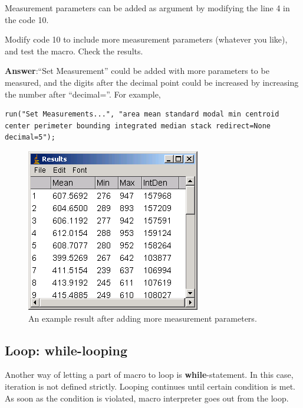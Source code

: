Measurement parameters can be added as argument by modifying the line 4 in the code 10.

\begin{indentexercise}{1}
Modify code 10 to include more measurement parameters (whatever you like), and test the macro. Check the results. 

\item \textbf{Answer}:``Set Measurement'' could be added with more parameters to be measured, and the digits after the decimal point could be increased by increasing the number after ``decimal=''. For example, 
\begin{lstlisting}[numbers=none]
run("Set Measurements...", "area mean standard modal min centroid center perimeter bounding integrated median stack redirect=None decimal=5");
\end{lstlisting}

\end{indentexercise}

\begin{figure}[htbp]
\begin{center}
\includegraphics[scale=0.5]{fig/fig2322_moreResultsTable.png}
\caption{An example result after adding more measurement parameters.}
\label{fig_MoreMeasurementPara}
\end{center}
\end{figure} 


\subsection{Loop: while-looping}

Another way of letting a part of macro to loop is \textbf{while}-statement. In this case, iteration is not defined strictly. Looping continues until certain condition is met. As soon as the condition is violated, macro interpreter goes out from the loop.

